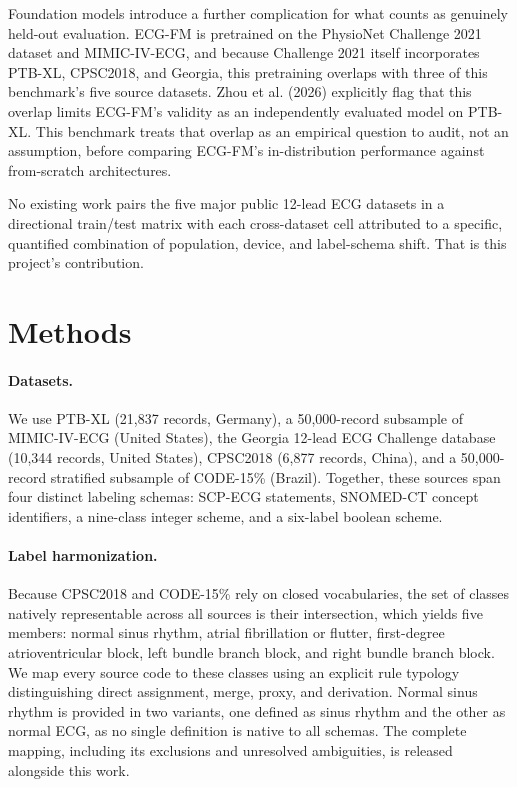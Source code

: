 \documentclass{article}
\begin{document}
Foundation models introduce a further complication for what counts as genuinely held-out evaluation. ECG-FM is pretrained on the PhysioNet Challenge 2021 dataset and MIMIC-IV-ECG, and because Challenge 2021 itself incorporates PTB-XL, CPSC2018, and Georgia, this pretraining overlaps with three of this benchmark's five source datasets. Zhou et al. (2026) explicitly flag that this overlap limits ECG-FM's validity as an independently evaluated model on PTB-XL. This benchmark treats that overlap as an empirical question to audit, not an assumption, before comparing ECG-FM's in-distribution performance against from-scratch architectures.

No existing work pairs the five major public 12-lead ECG datasets in a directional train/test matrix with each cross-dataset cell attributed to a specific, quantified combination of population, device, and label-schema shift. That is this project's contribution.

\section{Methods}

\paragraph{Datasets.}
We use PTB-XL (21,837 records, Germany), a 50,000-record subsample of MIMIC-IV-ECG (United States), the Georgia 12-lead ECG Challenge database (10,344 records, United States), CPSC2018 (6,877 records, China), and a 50,000-record stratified subsample of CODE-15\% (Brazil). Together, these sources span four distinct labeling schemas: SCP-ECG statements, SNOMED-CT concept identifiers, a nine-class integer scheme, and a six-label boolean scheme.

\paragraph{Label harmonization.}
Because CPSC2018 and CODE-15\% rely on closed vocabularies, the set of classes natively representable across all sources is their intersection, which yields five members: normal sinus rhythm, atrial fibrillation or flutter, first-degree atrioventricular block, left bundle branch block, and right bundle branch block. We map every source code to these classes using an explicit rule typology distinguishing direct assignment, merge, proxy, and derivation. Normal sinus rhythm is provided in two variants, one defined as sinus rhythm and the other as normal ECG, as no single definition is native to all schemas. The complete mapping, including its exclusions and unresolved ambiguities, is released alongside this work.
\end{document}
